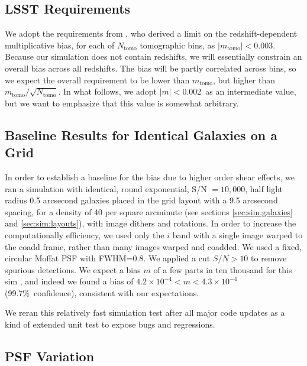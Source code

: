 \documentclass[twocolumn,twocolappendix,astrosym]{openjournal}
\newcommand{\mthresh}{0.002}
\begin{document}
\subsection{LSST Requirements} \label{sec:lsstreq}

We adopt the requirements from \cite{SRD}, who derived a limit on the
redshift-dependent multiplicative bias, for each of $N_{\mathrm{tomo}}$
tomographic bins, as $|m_{\mathrm{tomo}}| < 0.003$.  Because our simulation
does not contain redshifts, we will essentially constrain an overall bias
across all redshifts.  The bias will be partly correlated across bins, so we
expect the overall requirement to be lower than $m_{\mathrm{tomo}}$, but higher
than $m_{\mathrm{tomo}}/\sqrt{N_{\mathrm{tomo}}}$.  In what follows, we adopt
$|m| < $\mthresh\ as an intermediate value, but we want to emphasize that this
value is somewhat arbitrary.

\subsection{Baseline Results for Identical Galaxies on a Grid} \label{sec:results:base}

In order to establish a baseline for the bias due to higher order shear
effects, we ran a simulation with identical, round exponential, S/N $= 10,000$,
half light radius 0.5 arcsecond galaxies placed in the grid layout with a 9.5
arcsecond spacing, for a density of 40 per square arcminute (see sections
\ref{sec:sim:galaxies} and \ref{sec:sim:layouts}), with image dithers and
rotations.  In order to increase the computationally efficiency, we used only
the $i$ band with a single image warped to the coadd frame, rather than many
images warped and coadded.  We used a fixed, circular Moffat
PSF\citep{Moffat1969} with FWHM=0.8.  We applied a cut $S/N > 10$ to remove
spurious detections.  We expect a bias $m$ of a few parts in ten thousand for
this sim \citep{SheldonMcal2017}, and indeed we found a bias of $4.2\times
10^{-4} < m < 4.3\times 10^{-4}$ (99.7\%~confidence), consistent with our
expectations.

We reran this relatively fast simulation test after all major code updates as a
kind of extended unit test to expose bugs and regressions.

\subsection{PSF Variation} \label{sec:results:psfvar}
\end{document}
